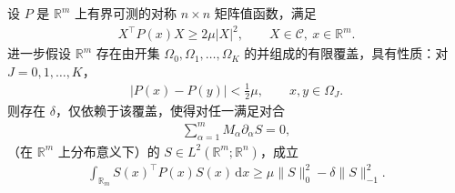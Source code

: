 \documentclass[../../main.tex]{subfiles}
\begin{document}
\begin{lemma}\label{lemma:ch05-compactness}
设 $P$ 是 $\mathbb{R}^{m}$ 上有界可测的对称 $n\times n$ 矩阵值函数，满足
\begin{align}
X^{\top}P(x)X\geqslant 2\mu|X|^{2},\qquad X\in\mathscr{C},\ x\in\mathbb{R}^{m}.\label{align:ch05-P-positive}
\end{align}
进一步假设 $\mathbb{R}^{m}$ 存在由开集 $\Omega_{0},\Omega_{1},\ldots,\Omega_{K}$ 的并组成的有限覆盖，具有性质：对 $J=0,1,\ldots,K$，
\begin{align}
|P(x)-P(y)|<\frac{1}{2}\mu,\qquad x,y\in\Omega_{J}.\label{align:ch05-P-oscillation}
\end{align}
则存在 $\delta$，仅依赖于该覆盖，使得对任一满足对合
\begin{align}
\sum_{\alpha=1}^{m}M_{\alpha}\partial_{\alpha}S=0,\label{align:ch05-S-involution}
\end{align}
（在 $\mathbb{R}^{m}$ 上分布意义下）的 $S\in L^{2}(\mathbb{R}^{m};\mathbb{R}^{n})$，成立
\begin{align}
\int_{\mathbb{R}_{m}}S(x)^{\top}P(x)S(x)\,\mathrm{d}x\geqslant\mu\|S\|_{0}^{2}-\delta\|S\|_{-1}^{2}.\label{align:ch05-compactness-est}
\end{align}
\end{lemma}
\end{document}
